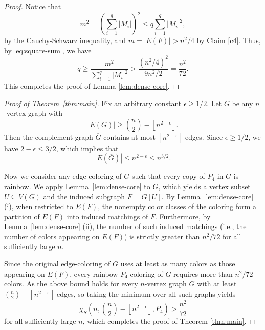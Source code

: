 \documentclass[11pt,a4paper]{article}
\newcommand{\chiS}{\chi_S}
\begin{document}
\begin{proof}
Notice that
\[
m^2=\left(\sum_{i=1}^q |M_i|\right)^2\le q\sum_{i=1}^q |M_i|^2,
\]
by the Cauchy-Schwarz inequality, and $m=|E(F)|> n^2/4$ by Claim \ref{c4}. Thus, by \eqref{eq:square-sum}, we have
\[
q\ge \frac{m^2}{\sum_{i=1}^q |M_i|^2}
>\frac{(n^2/4)^2}{9n^2/2}
=\frac{n^2}{72}.
\]
This completes the proof of Lemma \ref{lem:dense-core}.
\end{proof}







\begin{proof}[Proof of Theorem~\ref{thm:main}]


Fix an arbitrary constant $\epsilon \ge 1/2$. Let $G$ be any $n$-vertex graph with
\[
|E(G)| \ge \binom{n}{2} - \left\lfloor n^{2-\epsilon} \right\rfloor.
\]
Then the complement graph $\overline{G}$ contains at most $\left\lfloor n^{2-\epsilon} \right\rfloor$ edges. Since $\epsilon \ge 1/2$, we have $2-\epsilon \le 3/2$, which implies that
\[
|E(\overline{G})| \le n^{2-\epsilon} \le n^{3/2}.
\]

Now we consider any edge-coloring of $G$ such that every copy of $P_4$ in $G$ is rainbow. We apply Lemma~\ref{lem:dense-core} to $G$, which yields a vertex subset $U \subseteq V(G)$ and the induced subgraph $F = G[U]$. By Lemma~\ref{lem:dense-core}  (i), when restricted to $E(F)$, the nonempty color classes of the coloring form a partition of $E(F)$ into induced matchings of $F$. Furthermore, by Lemma~\ref{lem:dense-core}  (ii), the number of such induced matchings (i.e., the number of colors appearing on $E(F)$) is strictly greater than $n^2/72$ for all sufficiently large $n$.

Since the original edge-coloring of $G$ uses at least as many colors as those appearing on $E(F)$, every rainbow $P_4$-coloring of $G$ requires more than $n^2/72$ colors.
As the above bound holds for every $n$-vertex graph $G$ with at least $\binom{n}{2} - \left\lfloor n^{2-\epsilon} \right\rfloor$ edges, so taking the minimum over all such graphs yields
\[
\chiS\left(n, \binom{n}{2} - \left\lfloor n^{2-\epsilon} \right\rfloor, P_4\right) > \frac{n^2}{72}
\]
for all sufficiently large $n$, which completes the proof of Theorem \ref{thm:main}.
\end{proof}




\end{document}
